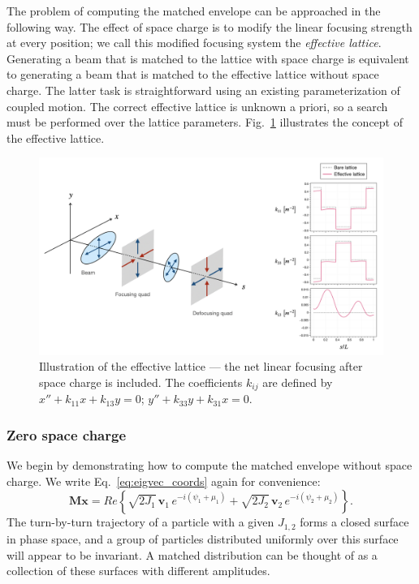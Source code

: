 The problem of computing the matched envelope can be approached in the following way. The effect of space charge is to modify the linear focusing strength at every position; we call this modified focusing system the \textit{effective lattice}. Generating a beam that is matched to the lattice with space charge is equivalent to generating a beam that is matched to the effective lattice without space charge. The latter task is straightforward using an existing parameterization of coupled motion. The correct effective lattice is unknown a priori, so a search must be performed over the lattice parameters. Fig.~\ref{fig:effective_lattice} illustrates the concept of the effective lattice.
%
\begin{figure}
    \centering
    \includegraphics[width=1.0\textwidth]{Images/chapter2/effective_lattice.png}
    \caption{Illustration of the effective lattice — the net linear focusing after space charge is included. The coefficients $k_{ij}$ are defined by $x'' + k_{11}x + k_{13}y = 0$; $y'' + k_{33}y + k_{31}x = 0$.}
    \label{fig:effective_lattice}
\end{figure}
%

\subsubsection{Zero space charge}

We begin by demonstrating how to compute the matched envelope without space charge. We write Eq.~\eqref{eq:eigvec_coords} again for convenience:
%
\begin{equation}
    \mathbf{Mx} = Re \left\{
        \sqrt{2 J_1} \, \mathbf{v}_1 \, e^{-i(\psi_1 + \mu_1)}
        + \sqrt{2 J_2} \, \mathbf{v}_2 \, e^{-i(\psi_2 + \mu_2)}
    \right\}.
\end{equation}
%
The turn-by-turn trajectory of a particle with a given $J_{1,2}$ forms a closed surface in phase space, and a group of particles distributed uniformly over this surface will appear to be invariant. A matched distribution can be thought of as a collection of these surfaces with different amplitudes.

